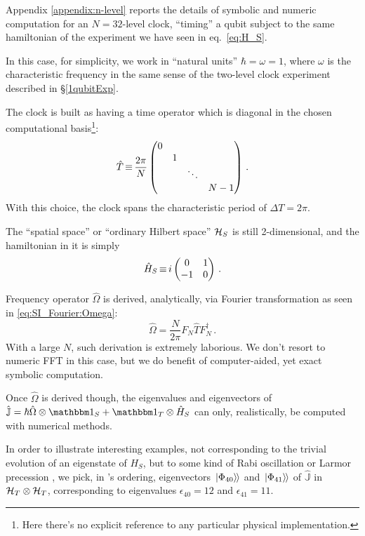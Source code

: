 Appendix \ref{appendix:n-level} reports the details of
symbolic and
numeric computation for
an $N=32$-level clock, ``timing'' a qubit subject to the same hamiltonian
of the experiment we have seen in eq.~\eqref{eq:H_S}.

In this case, for simplicity, we work in
``natural units'' $\hbar = \omega = 1$, where $\omega$ is
the characteristic frequency in the same sense of the
two-level clock experiment described in \S\ref{1qubitExp}.

The clock is built as having a time operator which is diagonal in the
chosen computational basis\footnote{
  Here there's no explicit reference to any particular physical implementation. 
}:
\[
  \hat{T} \operatorname*{\equiv} \frac{2\pi}{N}
  \begin{pmatrix}
    0           &       &       &       \\
                &1      &       &       \\
                &       &\ddots &       \\
                &       &       &N-1
  \end{pmatrix} \,\text{.}
\]
With this choice, the clock spans the characteristic period of $\Delta T = 2\pi$.

The ``spatial space'' or ``ordinary Hilbert space'' $\mathcal{H}_S$
is still 2-dimensional, and the hamiltonian in it is simply
\[
  \hat{H}_S \operatorname*{\equiv}
  i
  \begin{pmatrix}
    0   & 1   \\
    -1  & 0
  \end{pmatrix}
  \, \text{.}
\]

Frequency operator $\hat{\Omega}$ is derived, analytically, via Fourier
transformation as seen in \eqref{eq:SI_Fourier:Omega}:
\[
  \hat{\Omega} = \frac{N}{2\pi} F^{}_{N} \hat{T} F^{\dagger}_{N} \, \text{.}
\]
With a large $N$,
such derivation is extremely laborious. We don't resort to
numeric FFT in this case, but we do benefit of computer-aided, yet exact
symbolic computation.

Once $\hat{\Omega}$ is derived though,
the eigenvalues and eigenvectors of
$\hat{\mathbb{J}} = \hbar\hat{\Omega}\ox\idop_S + \idop_T\ox\hat{H}_S$
can only, realistically, be computed with numerical methods.

In order to illustrate interesting examples, not corresponding to the
trivial evolution of an eigenstate of $H_S$,
but to some kind of Rabi oscillation or Larmor precession
\parencite[Ch. IV]{Cohen-Tannoudji}, we pick, in 's ordering,
eigenvectors $\left.\left| \Phi_{40} \right\rangle\hspace{-0.115em}\right\rangle$ and $\left.\left| \Phi_{41} \right\rangle\hspace{-0.115em}\right\rangle$ of $\hat{\mathbb{J}}$
in $\mathcal{H}_T \otimes \mathcal{H}_T$, corresponding to eigenvalues
$\epsilon_{40} = 12$ and $\epsilon_{41} = 11$.

